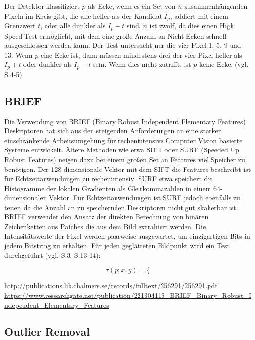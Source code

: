 Der Detektor klassifiziert $p$ als Ecke, wenn es ein Set von $n$ zusammenhängenden Pixeln im Kreis gibt, die alle heller als der Kandidat $I_p$, addiert mit einem Grenzwert $t$, oder alle dunkler als $I_p - t$ sind. $n$ ist zwölf, da dies einen High Speed Test ermöglicht, mit dem eine große Anzahl an Nicht-Ecken schnell ausgeschlossen werden kann. Der Test untersucht nur die vier Pixel 1, 5, 9 und 13. Wenn $p$ eine Ecke ist, dann müssen mindestens drei der vier Pixel heller als $I_p + t$ oder dunkler als $I_p - t$  sein. Wenn dies nicht zutrifft, ist $p$ keine Ecke. (vgl. \cite{fast} S.4-5)

\subsection{BRIEF}

Die Verwendung von BRIEF (Binary Robust Independent Elementary Features) Deskriptoren hat sich  aus den steigenden Anforderungen an eine stärker einschränkende Arbeitsumgebung für rechenintensive Computer Vision basierte Systeme entwickelt. Ältere Methoden wie etwa SIFT oder SURF (Speeded Up Robust Features) neigen dazu bei einem großen Set an Features viel Speicher zu benötigen. Der 128-dimensionale Vektor mit dem SIFT die Features beschreibt ist für Echtzeitanwendungen zu rechenintensiv. SURF etwa speichert die Histogramme der lokalen Gradienten als Gleitkommazahlen in einem 64-dimensionalen Vektor. Für Echtzeitanwendungen ist SURF jedoch ebenfalls zu teuer, da die Anzahl an zu speichernden Deskriptoren nicht gut skalierbar ist. BRIEF verwendet den Ansatz der direkten Berechnung von binären Zeichenketten aus Patches die aus dem Bild extrahiert werden. Die Intensitätswerte der Pixel werden paarweise ausgewertet, um einzigartigen Bits in jedem Bitstring zu erhalten. Für jeden geglätteten Bildpunkt wird ein Test durchgeführt (vgl. \cite{brief} S.3, \cite{orb_slam} S.13-14):


\begin{equation}
\tau(p;x,y)= \biggl\{
\end{equation}



http://publications.lib.chalmers.se/records/fulltext/256291/256291.pdf
\url{https://www.researchgate.net/publication/221304115_BRIEF_Binary_Robust_Independent_Elementary_Features}

\subsection{Outlier Removal}

